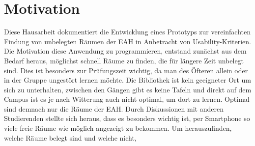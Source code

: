 \section{Motivation}

Diese Hausarbeit dokumentiert die Entwicklung eines Prototyps zur
vereinfachten Findung von unbelegten Räumen der \ac{EAH} in Anbetracht
von Usability-Kriterien. Die Motivation diese
Anwendung zu programmieren, entstand zunächst aus dem Bedarf heraus,
möglichst schnell Räume zu finden, die für längere Zeit unbelegt sind.
Dies ist besonders zur Prüfungszeit wichtig, da man des Öfteren allein oder
in der Gruppe ungestört lernen möchte. Die Bibliothek ist kein
geeigneter Ort um sich zu unterhalten, zwischen den Gängen
gibt es keine Tafeln und direkt auf dem Campus ist es je nach Witterung
auch nicht optimal, um dort zu lernen. Optimal sind demnach nur die Räume
der EAH. Durch Diskussionen mit anderen Studierenden stellte sich heraus,
dass es besonders wichtig ist, per Smartphone so viele freie Räume
wie möglich angezeigt zu bekommen.
Um herauszufinden, welche Räume belegt sind und welche nicht,
